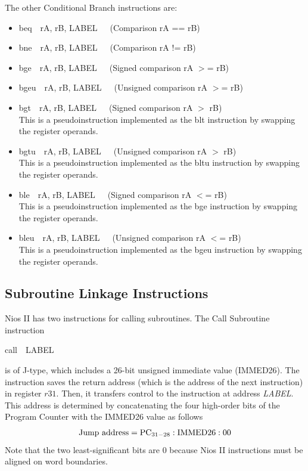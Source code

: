 \documentclass[11pt, twoside, pdftex]{article}
\begin{document}
\noindent
The other Conditional Branch instructions are:
\begin{itemize}
\item {\sf beq~~rA, rB, LABEL}~~~(Comparison rA == rB)
\item {\sf bne~~rA, rB, LABEL}~~~(Comparison rA != rB)
\item {\sf bge~~rA, rB, LABEL}~~~(Signed comparison rA $>$= rB)
\item {\sf bgeu~~rA, rB, LABEL}~~~(Unsigned comparison rA $>$= rB)
\item {\sf bgt~~rA, rB, LABEL}~~~(Signed comparison rA $>$ rB) \\
This is a pseudoinstruction implemented as the {\sf blt} instruction by swapping
the register operands.
\item {\sf bgtu~~rA, rB, LABEL}~~~(Unsigned comparison rA $>$ rB) \\
This is a pseudoinstruction implemented as the {\sf bltu} instruction by swapping
the register operands.
\item {\sf ble~~rA, rB, LABEL}~~~(Signed comparison rA $<$= rB) \\
This is a pseudoinstruction implemented as the {\sf bge} instruction by swapping
the register operands.
\item {\sf bleu~~rA, rB, LABEL}~~~(Unsigned comparison rA $<$= rB) \\
This is a pseudoinstruction implemented as the {\sf bgeu} instruction by swapping
the register operands.
\end{itemize}

\subsection{Subroutine Linkage Instructions}

Nios II has two instructions for calling subroutines. The Call Subroutine instruction
\begin{center}
{\sf call~~LABEL}
\end{center}
\noindent
is of J-type, which includes a 26-bit unsigned immediate value (IMMED26). 
The instruction saves the return address (which is the address of the next instruction) 
in register $r31$. Then, it transfers control to the instruction at address {\it LABEL}. 
This address is determined by concatenating the four high-order bits of the Program Counter 
with the IMMED26 value as follows
$$
{\rm Jump~address} = {\rm PC}_{31-28} : {\rm IMMED26} : 00
$$
\noindent
Note that the two least-significant bits are 0 because Nios II instructions must
be aligned on word boundaries.
 
\end{document}
